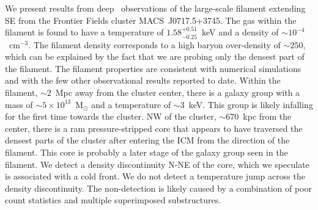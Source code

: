 We present results from deep \chandra\ observations of the large-scale filament extending SE from the Frontier Fields cluster MACS~J0717.5+3745. The gas within the filament is found to have a temperature of $1.58_{-0.25}^{+0.51}$~keV and a density of $\sim 10^{-4}$~cm$^{-3}$. The filament density corresponds to a high baryon over-density of $\sim 250$, which can be explained by the fact that we are probing only the densest part of the filament. The filament properties are consistent with numerical simulations and with the few other observational results reported to date. Within the filament, $\sim 2$~Mpc away from the cluster center, there is a galaxy group with a mass of $\sim 5\times 10^{13}$~M$_\odot$ and a temperature of $\sim 3$~keV. This group is likely infalling for the first time towards the cluster. NW of the cluster, $\sim 670$~kpc from the center, there is a ram pressure-stripped core that appears to have traversed the densest parts of the cluster after entering the ICM from the direction of the filament. This core is probably a later stage of the galaxy group seen in the filament. We detect a density discontinuity N-NE of the core, which we speculate is associated with a cold front. We do not detect a temperature jump across the density discontinuity. The non-detection is likely caused by a combination of poor count statistics and multiple superimposed substructures.